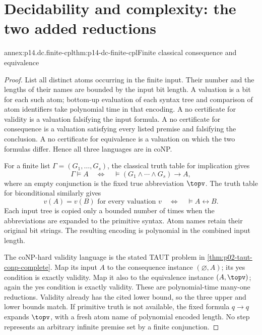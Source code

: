 \section{Decidability and complexity: the two added reductions}
\label{sec:annex-p14-decidability}

\begin{annexitem}{annex:p14.dc.finite-cpl}{thm:p14-dc-finite-cpl}{Finite classical consequence and equivalence}
\begin{proof}
List all distinct atoms occurring in the finite input. Their number and the
lengths of their names are bounded by the input bit length. A valuation is a
bit for each such atom; bottom-up evaluation of each syntax tree and comparison
of atom identifiers take polynomial time in that encoding. A no certificate
for validity is a valuation falsifying the input formula. A no certificate
for consequence is a valuation satisfying every listed premise and falsifying
the conclusion. A no certificate for equivalence is a valuation on which
the two formulas differ. Hence all three languages are in coNP.

For a finite list \(\Gamma=(G_1,\ldots,G_s)\), the classical truth table
for implication gives
\[
 \Gamma\models A
 \quad\Longleftrightarrow\quad
 \models (G_1\land\cdots\land G_s)\to A,
\]
where an empty conjunction is the fixed true abbreviation \(\topv\).
The truth table for biconditional similarly gives
\[
 v(A)=v(B)\text{ for every valuation }v
 \quad\Longleftrightarrow\quad\models A\leftrightarrow B.
\]
Each input tree is copied only a bounded number of times when the abbreviations
are expanded to the primitive syntax. Atom names retain their original bit
strings. The resulting encoding is polynomial in the combined input length.

The coNP-hard validity language is the stated TAUT problem in
\cref{thm:p02-taut-conp-complete}. Map its input \(A\) to the consequence
instance \((\varnothing,A)\); its yes condition is exactly validity. Map it
also to the equivalence instance \((A,\topv)\); again the yes condition is
exactly validity. These are polynomial-time many-one reductions. Validity
already has the cited lower bound, so the three upper and lower bounds match.
If primitive truth is not available, the fixed formula \(q\to q\) expands
\(\topv\), with a fresh atom name of polynomial encoded length. No step
represents an arbitrary infinite premise set by a finite conjunction.
\end{proof}
\end{annexitem}

